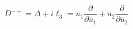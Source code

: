 \begin{equation}
D^{-+} = \Delta + i \ell_{3} = \bar{u}_{1}\frac{\partial}{\partial \bar{u}_{1}}
+\bar{u}_{2}\frac{\partial}{\partial \bar{u}_{2}}
\end{equation}

